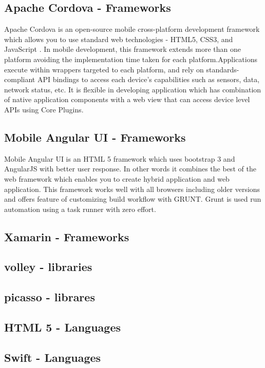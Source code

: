 \subsection{Apache Cordova - Frameworks}
              
              Apache Cordova is an open-source mobile cross-platform development framework which allows you to use standard web technologies - HTML5, CSS3, and JavaScript . In mobile development, this framework extends more than one platform avoiding the implementation time taken for each platform.Applications execute within wrappers targeted to each platform, and rely on standards-compliant API bindings to access each device's capabilities such as sensors, data, network status, etc. It is flexible in developing application which has combination of native application components with a web view that can access device level APIs using Core Plugins.           
   
\subsection{Mobile Angular UI - Frameworks}     
			
			Mobile Angular UI is an HTML 5 framework which uses bootstrap 3 and AngularJS with better user response. In other words it combines the best of the web framework which enables you to create hybrid application and web application. This framework works well with all browsers including older versions and offers feature of customizing build workflow with GRUNT. Grunt is used run automation  using a task runner with zero effort.
			
\subsection{Xamarin - Frameworks}

						
			

\subsection{volley - libraries}
\subsection{picasso - librares}

\subsection{HTML 5 - Languages}
\subsection{Swift - Languages}
